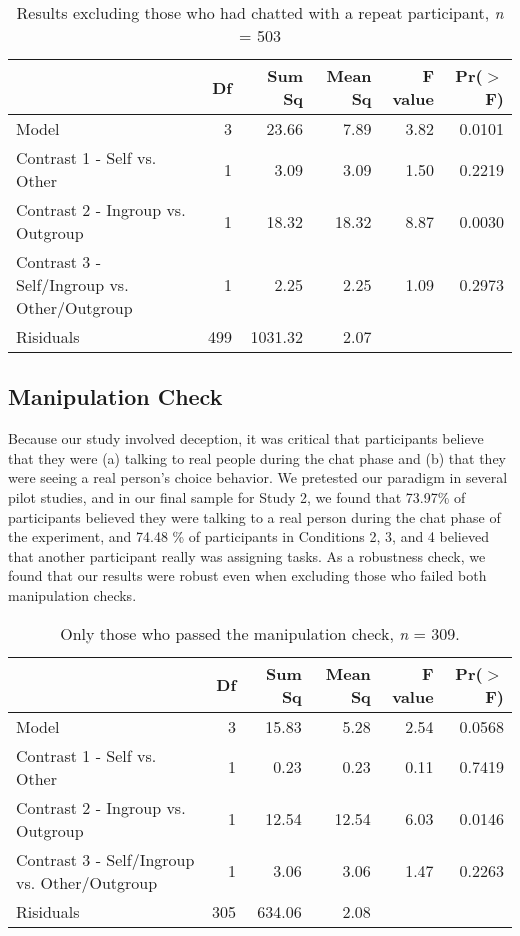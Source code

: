 \documentclass[12pt,]{article}
\begin{document}
\vspace{0.6cm}

\begin{table}[ht]
\centering
\begin{tabular}{lrrrrr}
  \hline
 & Df & Sum Sq & Mean Sq & F value & Pr($>$F) \\ 
  \hline
Model & 3 & 23.66 & 7.89 & 3.82 & 0.0101 \\ 
  Contrast 1 - Self vs. Other & 1 & 3.09 & 3.09 & 1.50 & 0.2219 \\ 
  Contrast 2 - Ingroup vs. Outgroup & 1 & 18.32 & 18.32 & 8.87 & 0.0030 \\ 
  Contrast 3 - Self/Ingroup vs. Other/Outgroup & 1 & 2.25 & 2.25 & 1.09 & 0.2973 \\ 
  Risiduals & 499 & 1031.32 & 2.07 &  &  \\ 
   \hline
\end{tabular}
\caption{Results excluding those who had chatted with a repeat participant, \emph{n} = 503} 
\label{repeats}
\end{table}


\newpage
\subsection{Manipulation Check}
\label{appendix:manip2}

Because our study involved deception, it was critical that participants believe that they were (a) talking to real people during the chat phase and (b) that they were seeing a real person's choice behavior. We pretested our paradigm in several pilot studies, and in our final sample for Study 2, we found that  73.97\% of participants believed they were talking to a real person during the chat phase of the experiment, and 74.48 \% of participants in Conditions 2, 3, and 4 believed that another participant really was assigning tasks. As a robustness check, we found that our results were robust even when excluding those who failed both manipulation checks. 

\vspace{0.6cm}

\begin{table}[ht]
\centering
\begin{tabular}{lrrrrr}
  \hline
 & Df & Sum Sq & Mean Sq & F value & Pr($>$F) \\ 
  \hline
Model & 3 & 15.83 & 5.28 & 2.54 & 0.0568 \\ 
  Contrast 1 - Self vs. Other & 1 & 0.23 & 0.23 & 0.11 & 0.7419 \\ 
  Contrast 2 - Ingroup vs. Outgroup & 1 & 12.54 & 12.54 & 6.03 & 0.0146 \\ 
  Contrast 3 - Self/Ingroup vs. Other/Outgroup & 1 & 3.06 & 3.06 & 1.47 & 0.2263 \\ 
  Risiduals & 305 & 634.06 & 2.08 &  &  \\ 
   \hline
\end{tabular}
\caption{Only those who passed the manipulation check, \emph{n} = 309.} 
\label{manip2}
\end{table}
\end{document}
